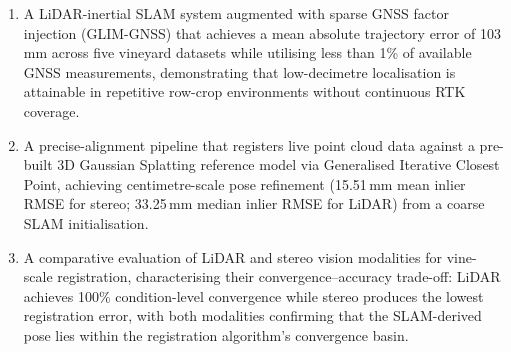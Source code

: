 \begin{enumerate}
    \item A LiDAR-inertial SLAM system augmented with sparse GNSS factor injection (GLIM-GNSS) that achieves a mean absolute trajectory error of 103\,mm across five vineyard datasets while utilising less than 1\% of available GNSS measurements, demonstrating that low-decimetre localisation is attainable in repetitive row-crop environments without continuous RTK coverage.

    \item A precise-alignment pipeline that registers live point cloud data against a pre-built 3D Gaussian Splatting reference model via Generalised Iterative Closest Point, achieving centimetre-scale pose refinement (15.51\,mm mean inlier RMSE for stereo; 33.25\,mm median inlier RMSE for LiDAR) from a coarse SLAM initialisation.

    \item A comparative evaluation of LiDAR and stereo vision modalities for vine-scale registration, characterising their convergence--accuracy trade-off: LiDAR achieves 100\% condition-level convergence while stereo produces the lowest registration error, with both modalities confirming that the SLAM-derived pose lies within the registration algorithm's convergence basin.
\end{enumerate}
